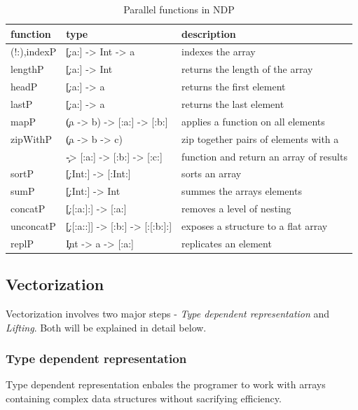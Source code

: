     \begin{table}[h]
      \caption{Parallel functions in NDP}
      \label{table:parfuns}
      \begin{tabular}{lll}
          \toprule
          function & type & description \\
          \midrule
          (!:),indexP & \c{[:a:] -> Int -> a} & indexes the array \\
          lengthP & \c{[:a:] -> Int} & returns the length of the array \\
          headP & \c{[:a:] -> a} & returns the first element\\
          lastP & \c{[:a:] -> a} & returns the last element \\
          mapP & \c{(a -> b) -> [:a:] -> [:b:]} & applies a function on all elements \\
          zipWithP & \c{(a -> b -> c)} & zip together pairs of elements with a \\
           & \c{-> [:a:] -> [:b:] -> [:c:]} & function and return an array of results \\
          sortP & \c{[:Int:] -> [:Int:]} & sorts an array \\
          sumP & \c{[:Int:] -> Int} & summes the arrays elements \\
          concatP & \c{[:[:a:]:] -> [:a:]} & removes a level of nesting \\
          unconcatP & \c{[:[:a::]] -> [:b:] -> [:[:b:]:]} & exposes a structure to a flat array \\
          replP & \c{Int -> a -> [:a:]} & replicates an element \\
      \end{tabular}
    \end{table}
    
  \subsection{Vectorization}
    Vectorization involves two major steps -
    \emph{Type dependent representation} and \emph{Lifting}.
    Both will be explained in detail below.
  
    \subsubsection{Type dependent representation}
      Type dependent representation enbales the programer
      to work with arrays containing complex
      data structures without sacrifying efficiency.
      
